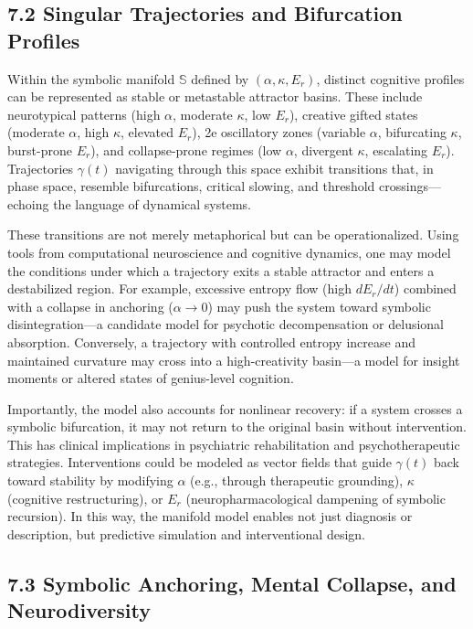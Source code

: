 
\subsection*{7.2 Singular Trajectories and Bifurcation Profiles}

Within the symbolic manifold $\mathbb{S}$ defined by $(\alpha, \kappa, E_r)$, distinct cognitive profiles can be represented as stable or metastable attractor basins. These include neurotypical patterns (high $\alpha$, moderate $\kappa$, low $E_r$), creative gifted states (moderate $\alpha$, high $\kappa$, elevated $E_r$), 2e oscillatory zones (variable $\alpha$, bifurcating $\kappa$, burst-prone $E_r$), and collapse-prone regimes (low $\alpha$, divergent $\kappa$, escalating $E_r$). Trajectories $\gamma(t)$ navigating through this space exhibit transitions that, in phase space, resemble bifurcations, critical slowing, and threshold crossings—echoing the language of dynamical systems.

These transitions are not merely metaphorical but can be operationalized. Using tools from computational neuroscience and cognitive dynamics, one may model the conditions under which a trajectory exits a stable attractor and enters a destabilized region. For example, excessive entropy flow (high $dE_r/dt$) combined with a collapse in anchoring ($\alpha \rightarrow 0$) may push the system toward symbolic disintegration—a candidate model for psychotic decompensation or delusional absorption. Conversely, a trajectory with controlled entropy increase and maintained curvature may cross into a high-creativity basin—a model for insight moments or altered states of genius-level cognition.

Importantly, the model also accounts for nonlinear recovery: if a system crosses a symbolic bifurcation, it may not return to the original basin without intervention. This has clinical implications in psychiatric rehabilitation and psychotherapeutic strategies. Interventions could be modeled as vector fields that guide $\gamma(t)$ back toward stability by modifying $\alpha$ (e.g., through therapeutic grounding), $\kappa$ (cognitive restructuring), or $E_r$ (neuropharmacological dampening of symbolic recursion). In this way, the manifold model enables not just diagnosis or description, but predictive simulation and interventional design.

\subsection*{7.3 Symbolic Anchoring, Mental Collapse, and Neurodiversity}


